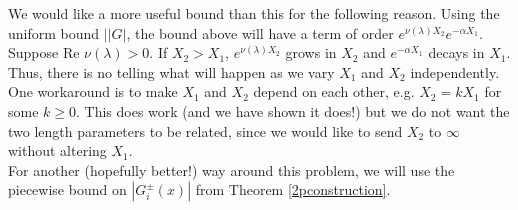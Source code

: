 \documentclass[12pt]{article}
\begin{document}
We would like a more useful bound than this for the following reason. Using the uniform bound $||G|$, the bound above will have a term of order $e^{\nu(\lambda)X_2} e^{-\alpha X_1}$. Suppose $\text{Re }\nu(\lambda) > 0$. If $X_2 > X_1$, $e^{\nu(\lambda)X_2}$ grows in $X_2$ and $e^{-\alpha X_1}$ decays in $X_1$. Thus, there is no telling what will happen as we vary $X_1$ and $X_2$ independently. One workaround is to make $X_1$ and $X_2$ depend on each other, e.g. $X_2 = k X_1$ for some $k \geq 0$. This does work (and we have shown it does!) but we do not want the two length parameters to be related, since we would like to send $X_2$ to $\infty$ without altering $X_1$.\\

For another (hopefully better!) way around this problem, we will use the piecewise bound on $|G_i^\pm(x)|$ from Theorem \ref{2pconstruction}.

\end{document}
